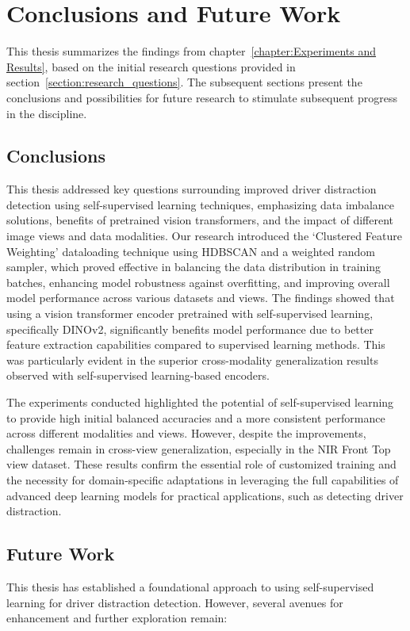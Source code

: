 \chapter{Conclusions and Future Work}
\label{Conclusions and Future Work}
This thesis summarizes the findings from chapter~\ref{chapter:Experiments and Results}, based on the initial research questions provided in section~\ref{section:research_questions}. The subsequent sections present the conclusions and possibilities for future research to stimulate subsequent progress in the discipline.

\section{Conclusions}
This thesis addressed key questions surrounding improved driver distraction detection using self-supervised learning techniques, emphasizing data imbalance solutions, benefits of pretrained vision transformers, and the impact of different image views and data modalities. Our research introduced the `Clustered Feature Weighting' dataloading technique using HDBSCAN and a weighted random sampler, which proved effective in balancing the data distribution in training batches, enhancing model robustness against overfitting, and improving overall model performance across various datasets and views. The findings showed that using a vision transformer encoder pretrained with self-supervised learning, specifically DINOv2, significantly benefits model performance due to better feature extraction capabilities compared to supervised learning methods. This was particularly evident in the superior cross-modality generalization results observed with self-supervised learning-based encoders.

The experiments conducted highlighted the potential of self-supervised learning to provide high initial balanced accuracies and a more consistent performance across different modalities and views. However, despite the improvements, challenges remain in cross-view generalization, especially in the NIR Front Top view dataset. These results confirm the essential role of customized training and the necessity for domain-specific adaptations in leveraging the full capabilities of advanced deep learning models for practical applications, such as detecting driver distraction.

\section{Future Work}
This thesis has established a foundational approach to using self-supervised learning for driver distraction detection. However, several avenues for enhancement and further exploration remain:

